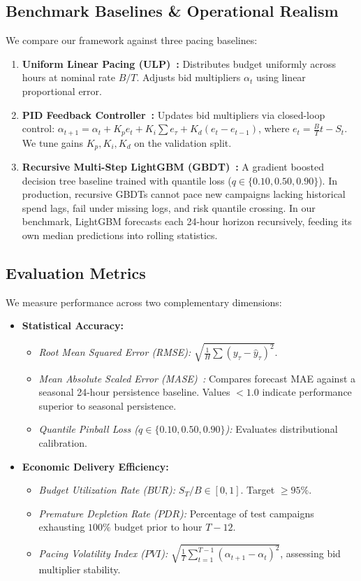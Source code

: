 \documentclass[sigconf]{acmart}
\begin{document}
\subsection{Benchmark Baselines \& Operational Realism}
We compare our framework against three pacing baselines:
\begin{enumerate}
    \item \textbf{Uniform Linear Pacing (ULP)~\cite{xu2015smart}:} Distributes budget uniformly across hours at nominal rate $B/T$. Adjusts bid multipliers $\alpha_t$ using linear proportional error.
    \item \textbf{PID Feedback Controller~\cite{lee2013real}:} Updates bid multipliers via closed-loop control: $\alpha_{t+1} = \alpha_t + K_p e_t + K_i \sum e_\tau + K_d (e_t - e_{t-1})$, where $e_t = \frac{B}{T} t - S_t$. We tune gains $K_p, K_i, K_d$ on the validation split.
    \item \textbf{Recursive Multi-Step LightGBM (GBDT)~\cite{ke2017lightgbm}:} A gradient boosted decision tree baseline trained with quantile loss ($q \in \{0.10, 0.50, 0.90\}$). In production, recursive GBDTs cannot pace new campaigns lacking historical spend lags, fail under missing logs, and risk quantile crossing. In our benchmark, LightGBM forecasts each 24-hour horizon recursively, feeding its own median predictions into rolling statistics.
\end{enumerate}

\subsection{Evaluation Metrics}
We measure performance across two complementary dimensions:
\begin{itemize}
    \item \textbf{Statistical Accuracy:}
    \begin{itemize}
        \item \emph{Root Mean Squared Error (RMSE):} $\sqrt{\frac{1}{H}\sum (y_\tau - \hat{y}_\tau)^2}$.
        \item \emph{Mean Absolute Scaled Error (MASE)~\cite{hyndman2006another}:} Compares forecast MAE against a seasonal 24-hour persistence baseline. Values $< 1.0$ indicate performance superior to seasonal persistence.
        \item \emph{Quantile Pinball Loss ($q \in \{0.10, 0.50, 0.90\}$):} Evaluates distributional calibration.
    \end{itemize}
    \item \textbf{Economic Delivery Efficiency:}
    \begin{itemize}
        \item \emph{Budget Utilization Rate ($BUR$):} $S_T / B \in [0, 1]$. Target $\ge 95\%$.
        \item \emph{Premature Depletion Rate ($PDR$):} Percentage of test campaigns exhausting $100\%$ budget prior to hour $T-12$.
        \item \emph{Pacing Volatility Index ($PVI$):} $\sqrt{\frac{1}{T}\sum_{t=1}^{T-1} (\alpha_{t+1} - \alpha_t)^2}$, assessing bid multiplier stability.
    \end{itemize}
\end{itemize}
\end{document}
